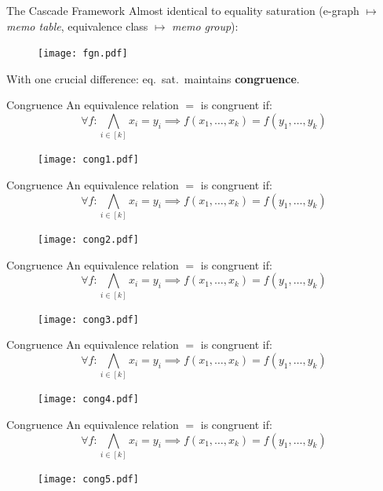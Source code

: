 \documentclass{beamer}
\begin{document}
  \begin{frame}{The Cascade Framework}
    Almost identical to equality saturation 
    (e-graph $\mapsto$ {\em memo table}, 
    equivalence class $\mapsto$ {\em memo group}):
    \begin{figure}
      \texttt{[image: fgn.pdf]}
    \end{figure}
    With one crucial difference: eq.~sat.~maintains 
    \textbf{congruence}.
  \end{frame}

  \begin{frame}{Congruence}
    An equivalence relation $=$ is congruent if:
 \[\forall f : \bigwedge_{i \in [k]} x_i = y_i \implies
  f(x_1, \ldots, x_k) = f(y_1, \ldots, y_k)\] \pause
  \begin{figure}
    \texttt{[image: cong1.pdf]}
  \end{figure}
  \end{frame}

  \begin{frame}{Congruence}
    An equivalence relation $=$ is congruent if:
 \[\forall f : \bigwedge_{i \in [k]} x_i = y_i \implies
  f(x_1, \ldots, x_k) = f(y_1, \ldots, y_k)\] 
  \begin{figure}
    \texttt{[image: cong2.pdf]}
  \end{figure}
  \end{frame}

  \begin{frame}{Congruence}
    An equivalence relation $=$ is congruent if:
 \[\forall f : \bigwedge_{i \in [k]} x_i = y_i \implies
  f(x_1, \ldots, x_k) = f(y_1, \ldots, y_k)\] 
  \begin{figure}
    \texttt{[image: cong3.pdf]}
  \end{figure}
  \end{frame}

  \begin{frame}{Congruence}
    An equivalence relation $=$ is congruent if:
 \[\forall f : \bigwedge_{i \in [k]} x_i = y_i \implies
  f(x_1, \ldots, x_k) = f(y_1, \ldots, y_k)\] 
  \begin{figure}
    \texttt{[image: cong4.pdf]}
  \end{figure}
  \end{frame}

  \begin{frame}{Congruence}
    An equivalence relation $=$ is congruent if:
 \[\forall f : \bigwedge_{i \in [k]} x_i = y_i \implies
  f(x_1, \ldots, x_k) = f(y_1, \ldots, y_k)\] 
  \begin{figure}
    \texttt{[image: cong5.pdf]}
  \end{figure}
  \end{frame}
\end{document}
